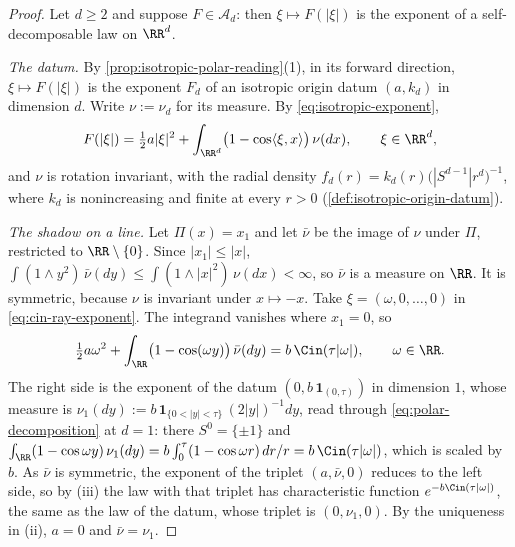 \begin{proof}
\leanok
Let $d \ge 2$ and suppose $F \in \mathcal{A}_d$: then $\xi \mapsto F(|\xi|)$ is the exponent of a
self-decomposable law on $\RR^d$.

\emph{The datum.} By \ref{prop:isotropic-polar-reading}(1), in its forward direction,
$\xi \mapsto F(|\xi|)$ is the exponent $F_d$ of an isotropic origin datum $(a,k_d)$ in dimension
$d$. Write $\nu := \nu_d$ for its \Levy{} measure. By \ref{eq:isotropic-exponent},
\begin{equation}\label{eq:cin-ray-exponent}
  F(|\xi|) = \tfrac12 a|\xi|^2
   + \int_{\RR^d}\bigl(1 - \cos\langle\xi,x\rangle\bigr)\,\nu(dx), \qquad \xi \in \RR^d ,
\end{equation}
and $\nu$ is rotation invariant, with the radial density
$f_d(r) = k_d(r)\bigl(|S^{d-1}|r^d\bigr)^{-1}$, where $k_d$ is nonincreasing and finite at every
$r > 0$ (\ref{def:isotropic-origin-datum}).

\emph{The shadow on a line.} Let $\Pi(x) = x_1$ and let $\bar\nu$ be the image of $\nu$ under
$\Pi$, restricted to $\RR \setminus \{0\}$. Since $|x_1| \le |x|$,
$\int(1 \wedge y^2)\,\bar\nu(dy) \le \int(1 \wedge |x|^2)\,\nu(dx) < \infty$, so $\bar\nu$ is a
\Levy{} measure on $\RR$. It is symmetric, because $\nu$ is invariant under $x \mapsto -x$. Take
$\xi = (\omega,0,\dots,0)$ in \ref{eq:cin-ray-exponent}. The integrand vanishes where $x_1 = 0$,
so
\[
  \tfrac12 a\omega^2 + \int_{\RR}\bigl(1 - \cos(\omega y)\bigr)\,\bar\nu(dy) = b\,\Cin(\tau|\omega|),
  \qquad \omega \in \RR .
\]
The right side is the exponent of the datum $(0, b\,\mathbf{1}_{(0,\tau)})$ in dimension $1$, whose
\Levy{} measure is $\nu_1(dy) := b\,\mathbf{1}_{\{0<|y|<\tau\}}\,(2|y|)^{-1}dy$, read through
\ref{eq:polar-decomposition} at $d = 1$: there $S^0 = \{\pm1\}$ and
$\int_{\RR}(1 - \cos\omega y)\,\nu_1(dy) = b\int_0^\tau(1-\cos\omega r)\,dr/r = b\,\Cin(\tau|\omega|)$,
which is  scaled by $b$. As $\bar\nu$ is symmetric, the exponent of the triplet
$(a,\bar\nu,0)$ reduces to the left side, so by (iii) the law with that triplet has
characteristic function $e^{-b\Cin(\tau|\omega|)}$, the same as the law of the datum, whose triplet
is $(0,\nu_1,0)$. By the uniqueness in (ii), $a = 0$ and $\bar\nu = \nu_1$.


\end{proof}
